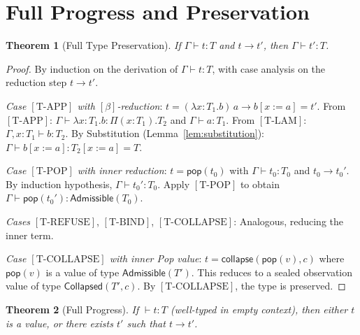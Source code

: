 \documentclass[12pt, a4paper, openany]{book}
\theoremstyle{plain}
\newtheorem{theorem}{Theorem}[chapter]
\theoremstyle{definition}
\theoremstyle{remark}
\newcommand{\Adm}{\mathsf{Admissible}}
\newcommand{\Col}{\mathsf{Collapsed}}
\begin{document}
\section{Full Progress and Preservation}

\begin{theorem}[Full Type Preservation]
\label{thm:preservation-full}
If $\Gamma \vdash t : T$ and $t \to t'$, then $\Gamma \vdash t' : T$.
\end{theorem}

\begin{proof}
By induction on the derivation of $\Gamma \vdash t : T$, with case analysis
on the reduction step $t \to t'$.

\textit{Case $[\mathrm{T\text{-}APP}]$ with $[\beta]$-reduction}:
$t = (\lambda x:T_1.b)\, a \to b[x:=a] = t'$.
From $[\mathrm{T\text{-}APP}]$: $\Gamma \vdash \lambda x:T_1.b : \Pi(x:T_1).T_2$
and $\Gamma \vdash a : T_1$.
From $[\mathrm{T\text{-}LAM}]$: $\Gamma, x:T_1 \vdash b : T_2$.
By Substitution (Lemma~\ref{lem:substitution}): $\Gamma \vdash b[x:=a] : T_2[x:=a] = T$.

\textit{Case $[\mathrm{T\text{-}POP}]$ with inner reduction}:
$t = \mathsf{pop}(t_0)$ with $\Gamma \vdash t_0 : T_0$ and $t_0 \to t_0'$.
By induction hypothesis, $\Gamma \vdash t_0' : T_0$.
Apply $[\mathrm{T\text{-}POP}]$ to obtain $\Gamma \vdash \mathsf{pop}(t_0') : \Adm(T_0)$.

\textit{Cases} $[\mathrm{T\text{-}REFUSE}]$, $[\mathrm{T\text{-}BIND}]$,
$[\mathrm{T\text{-}COLLAPSE}]$: Analogous, reducing the inner term.

\textit{Case $[\mathrm{T\text{-}COLLAPSE}]$ with inner Pop value}:
$t = \mathsf{collapse}(\mathsf{pop}(v), c)$ where $\mathsf{pop}(v)$ is a value
of type $\Adm(T')$. This reduces to a sealed observation value of type $\Col(T', c)$.
By $[\mathrm{T\text{-}COLLAPSE}]$, the type is preserved.
\end{proof}

\begin{theorem}[Full Progress]
\label{thm:progress-full}
If $\vdash t : T$ (well-typed in empty context), then either $t$ is a value,
or there exists $t'$ such that $t \to t'$.
\end{theorem}
\end{document}

